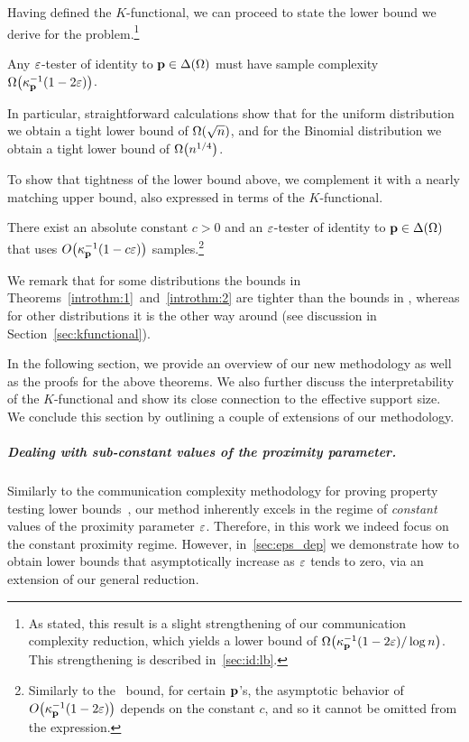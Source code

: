 Having defined the $K$-functional, we can proceed to state the lower bound we derive for the problem.\footnote{As stated, this result is a slight strengthening of our communication complexity reduction, which yields a lower bound of $\bigOmega{\kf{\p}^{-1}(1-2\eps)/\log n}$. This strengthening is described in~\cref{sec:id:lb}.}
\begin{theorem}
\label{introthm:1}
Any $\varepsilon$-tester of identity to $\mathbf{p}\in\Delta\!\left(\Omega\right)$ must have sample complexity $\bigOmega{\kf{\p}^{-1}(1-2\eps)}$.
\end{theorem}
\noindent 
In particular, straightforward calculations show that for the uniform distribution we obtain a tight lower bound of $\bigOmega{\sqrt{n}}$, and for the Binomial distribution we obtain a tight lower bound of $\bigOmega{n^{1/4}}$.

To show that tightness of the lower bound above, we complement it with a nearly matching upper bound, also expressed in terms of the $K$-functional.
\begin{theorem}
\label{introthm:2}
There exist an absolute constant $c>0$ and an $\varepsilon$-tester of identity to $\mathbf{p}\in\Delta\!\left(\Omega\right)$ that uses $\bigO{\kf{\p}^{-1}(1-c\eps)}$ samples.\footnote{Similarly to the~\cite{VV:14} bound, for certain $\mathbf{p}$'s, the asymptotic behavior of $\bigO{\kf{\p}^{-1}(1-2\eps)}$ depends on the constant $c$, and so it cannot be omitted from the expression.}
\end{theorem}
\noindent We remark that for some distributions the bounds in Theorems~\ref{introthm:1}~and~\ref{introthm:2} are tighter than the bounds in \cite{VV:14}, whereas for other distributions it is the other way around (see discussion in Section~\ref{sec:kfunctional}).

In the following section, we provide an overview of our new methodology as well as the proofs for the above theorems. We also further discuss the interpretability of the $K$-functional and show its close connection to the effective support size. We conclude this section by outlining a couple of extensions of our methodology.

\subparagraph{Dealing with sub-constant values of the proximity parameter.} Similarly to the communication complexity methodology for proving property testing lower bounds~\cite{BBM:12}, our method inherently excels in the regime of \emph{constant} values of the proximity parameter $\varepsilon$. Therefore, in this work we indeed focus on the constant proximity regime. However, in~\cref{sec:eps_dep} we demonstrate how to obtain lower bounds that asymptotically increase as $\varepsilon$ tends to zero, via an extension of our general reduction.


